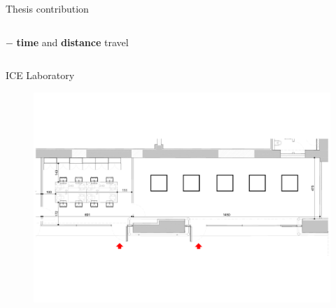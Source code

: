 \begin{frame}[fragile]{Thesis contribution}
\begin{columns}
\begin{column}{.4\textwidth}
                $-$ {\bf time} and {\bf distance} travel 
            \begin{figure}
                \qquad
            \end{figure}
            \end{column}
        \end{columns}
    \end{frame}

    \begin{frame}[fragile]{ICE Laboratory}
        \begin{figure}[hbt]
            \centering
            \includegraphics[width=\textwidth]{img/model1}
        \end{figure}
    \end{frame}

